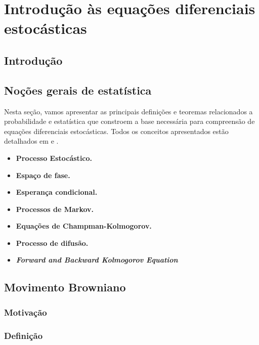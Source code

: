 \chapter{Introdução às equações diferenciais estocásticas} \label{cap:ch02_introducao_a_sde}

\section{Introdução} \label{sec:ch02_introducao}

\section{Noções gerais de estatística}
Nesta seção, vamos apresentar as principais definições e teoremas relacionados a probabilidade e estatística que constroem a base necessária para compreensão de equações diferenciais estocásticas. Todos os conceitos apresentados estão detalhados em \citet{Pavliotis2014} e \citet{Evans2014}.

\begin{itemize}
    \item \textbf{Processo Estocástico.}
    \item \textbf{Espaço de fase.}
    \item \textbf{Esperança condicional.}
    \item \textbf{Processos de Markov.}
    \item \textbf{Equações de Champman-Kolmogorov.}
    \item \textbf{Processo de difusão.}
    \item \textbf{\textit{Forward and Backward Kolmogorov Equation}}
\end{itemize}

\section{Movimento Browniano} \label{sec:ch02-movimento-browniano}

\subsection{Motivação} \label{subsec:ch02-motivacao-movimento-browniano}

\subsection{Definição}

